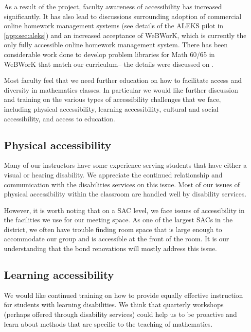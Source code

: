 As a result of the project, faculty awareness of accessibility has increased
significantly. It has also lead to discussions surrounding adoption of
commercial online homework management systems (see details of the ALEKS pilot
in \vref{app:sec:aleks}) and an increased acceptance of WeBWorK, which is currently 
the only fully accessible online homework
management system. There has been considerable work done to develop problem
libraries for Math 60/65 in WeBWorK that match our curriculum-- the details were 
discussed on .

Most faculty feel that we need further education on how to facilitate access
and diversity in mathematics classes. In particular we would like further
discussion and training on the various types of accessibility challenges that
we face, including physical accessibility, learning accessibility, cultural and
social accessibility, and access to education.

\subsection{Physical accessibility}
Many of our instructors have some experience serving students that have either
a visual or hearing disability. We appreciate the continued relationship and
communication with the disabilities services on this issue. Most of our issues
of physical accessibility within the classroom are handled well by disability
services. 

However, it is worth noting that on a SAC level, we face issues of
accessibility in the facilities we use for our meeting space. As one of the
largest SACs in the district, we often have trouble finding room space that is
large enough to accommodate our group and is accessible at the front of the
room. It is our understanding that the bond renovations will mostly address
this issue.

\subsection{Learning accessibility}
We would like continued training on how to provide equally effective
instruction for students with learning disabilities. We think that quarterly
workshops (perhaps offered through disability services) could help us to be
proactive and learn about methods that are specific to the teaching of
mathematics.

